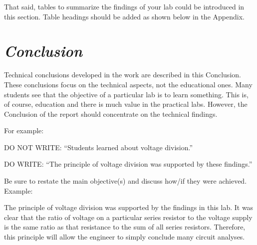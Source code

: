 \documentclass{article}
\begin{document}
That said, tables to summarize the findings of your lab could be introduced in this section. Table headings should be added as shown below in the Appendix.

\section{\textbf{\textit{Conclusion}}}

Technical conclusions developed in the work are described in this Conclusion. These conclusions focus on the technical aspects, not the educational ones. Many students see that the objective of a particular lab is to learn something. This is, of course, education and there is much value in the practical labs. However, the Conclusion of the report should concentrate on the technical findings.



For example:

DO NOT WRITE: “Students learned about voltage division.”

DO WRITE: “The principle of voltage division was supported by these findings.”



Be sure to restate the main objective(s) and discuss how/if they were achieved. Example:

The principle of voltage division was supported by the findings in this lab. It was clear that the ratio of voltage on a particular series resistor to the voltage supply is the same ratio as that resistance to the sum of all series resistors.  Therefore, this principle will allow the engineer to simply conclude many circuit analyses.

\end{document}
